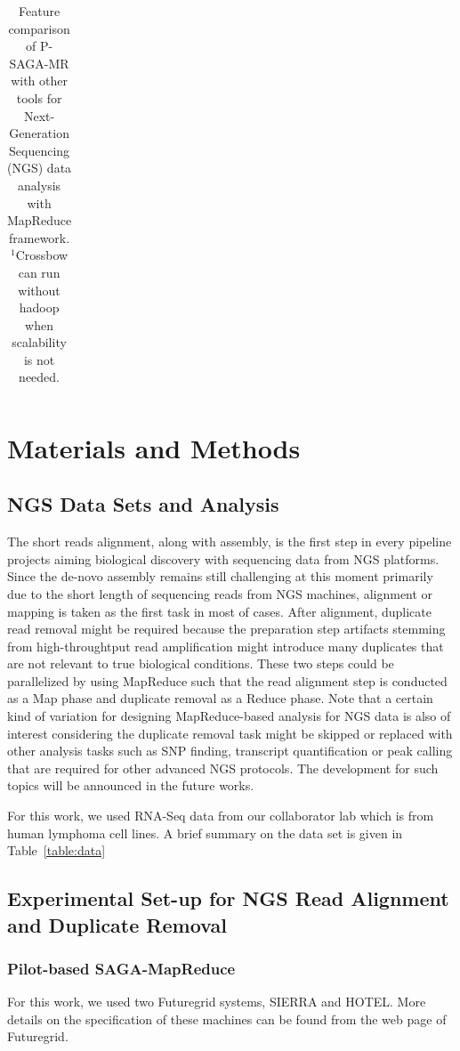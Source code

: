 \documentclass{sig-alternate}
\begin{document}
\begin{center}
\begin{table}[ht]
{\begin{tabular}{|l|l|c|c|c|c|c|c|}
\hline
\end{tabular}}
\hfill{}
\caption{Feature comparison of P-SAGA-MR with other tools for Next-Generation Sequencing (NGS) data analysis with MapReduce framework.  $^{1}${Crossbow can run without hadoop when scalability is not needed.} }
 \label{table:mr-comparison}
\end{table}
\end{center}

\section{Materials and Methods}
\subsection{NGS Data Sets and Analysis}
The short reads alignment, along with assembly, is the first step in every pipeline projects aiming biological discovery with sequencing data from NGS platforms.  Since the de-novo assembly remains still challenging at this moment primarily due to the short length of sequencing reads from NGS machines, alignment or mapping is taken as the first task in most of cases.  After alignment, duplicate read removal might be required because the preparation step artifacts stemming from high-throughtput read amplification might introduce many duplicates that are not relevant to true biological conditions.  These two steps could be parallelized by using MapReduce such that the read alignment step is conducted as a Map phase and duplicate removal as a Reduce phase.  Note that a certain kind of variation for designing MapReduce-based analysis for NGS data is also of interest considering the duplicate removal task might be skipped or replaced with other analysis tasks such as SNP finding, transcript quantification or peak calling that are required for other advanced NGS protocols.  The development for such topics will be announced in the future works.

For this work, we used RNA-Seq data from our collaborator lab which is from human lymphoma cell lines.  A brief summary on the data set is given in Table~\ref{table:data}

\subsection{Experimental Set-up for NGS Read Alignment and Duplicate Removal}
\subsubsection{Pilot-based SAGA-MapReduce}
For this work, we used two Futuregrid systems, SIERRA and HOTEL.  More details on the specification of these machines can be found from the web page of Futuregrid\cite{futuregrid_url}.  
\end{document}
